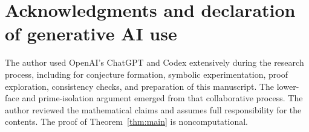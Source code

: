 \documentclass[11pt]{article}
\begin{document}
\section*{Acknowledgments and declaration of generative AI use}

The author used OpenAI's ChatGPT and Codex extensively during the research
process, including for conjecture formation, symbolic experimentation,
proof exploration, consistency checks, and preparation of this manuscript.
The lower-face and prime-isolation argument emerged from that collaborative
process.  The author reviewed the mathematical claims and assumes full
responsibility for the contents.  The proof of Theorem~\ref{thm:main} is
noncomputational.



\end{document}
